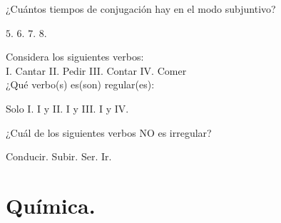 \documentclass[12pt]{exam}
\begin{document}
\begin{questions}
\begin{oneparchoices}
    \end{oneparchoices}
    \question ¿Cuántos tiempos de conjugación hay en el modo subjuntivo?
    \\[0.5em]
    \begin{oneparchoices}
        \choice $5$.
        \choice $6$.
        \choice $7$.
        \choice $8$.
    \end{oneparchoices}
    \question Considera los siguientes verbos: \\[0.5em]
    I. Cantar \hspace{1cm} II. Pedir \hspace{1cm} III. Contar \hspace{1cm} IV. Comer
    \\[0.5em]
    ¿Qué verbo(s) es(son) regular(es):
    \\[0.5em]
    \begin{oneparchoices}
        \choice Solo I.
        \choice I y II.
        \choice I y III.
        \choice I y IV.
    \end{oneparchoices}
    \question ¿Cuál de los siguientes verbos NO es irregular?
    \\[0.5em]
    \begin{oneparchoices}
        \choice Conducir.
        \choice Subir.
        \choice Ser.
        \choice Ir.
    \end{oneparchoices}
\end{questions}

\newpage

\section{Química.}
\end{document}
